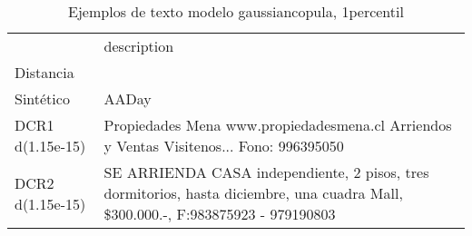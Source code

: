 \begin{table}[H]
\centering
\fontsize{10}{14}\selectfont
\caption{Ejemplos de texto modelo gaussiancopula, 1percentil}
\label{table-example-economicos-b-2-gaussiancopula-1p-text}
\begin{tabular}{|l|m{35em}|}
\hline
\rowcolor[gray]{0.8}
 & description \\
Distancia &  \\
\hline Sintético & AADay \\
\hline DCR1 d(1.15e-15) & Propiedades Mena www.propiedadesmena.cl Arriendos y Ventas Visitenos... Fono: 996395050 \\
\hline DCR2 d(1.15e-15) & SE ARRIENDA CASA independiente, 2 pisos, tres dormitorios, hasta diciembre, una cuadra Mall, \$300.000.-, F:983875923 - 979190803 \\
\hline
\end{tabular}
\end{table}
